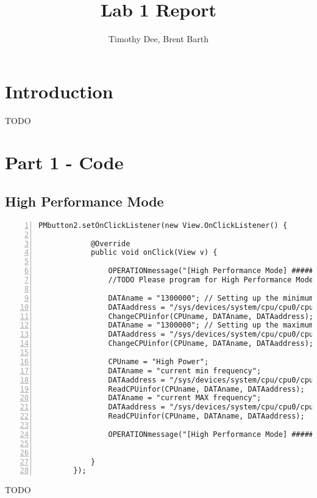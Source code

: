 \documentclass{article}	%
\author{Timothy Dee, Brent Barth}
\title{Lab 1 Report}
\begin{document}
\twocolumn
\thispagestyle{empty}		%
\maketitle			%



\section{Introduction}
TODO

\section{Part 1 - Code}
\subsection{High Performance Mode}
\begin{lstlisting}[float=*, caption={High Performance Mode},label={lst:HPM},numbers=left]
PMbutton2.setOnClickListener(new View.OnClickListener() {

			@Override
			public void onClick(View v) {

				OPERATIONmessage("[High Performance Mode] ###########################################");
				//TODO Please program for High Performance Mode here (done)

				DATAname = "1300000"; // Setting up the minimum frequency 1300 Mhz
				DATAaddress = "/sys/devices/system/cpu/cpu0/cpufreq/scaling_min_freq";
				ChangeCPUinfor(CPUname, DATAname, DATAaddress);
				DATAname = "1300000"; // Setting up the maximum frequency at 1300 MHz
				DATAaddress = "/sys/devices/system/cpu/cpu0/cpufreq/scaling_max_freq";
				ChangeCPUinfor(CPUname, DATAname, DATAaddress);

				CPUname = "High Power";
				DATAname = "current min frequency";
				DATAaddress = "/sys/devices/system/cpu/cpu0/cpufreq/scaling_min_freq";
				ReadCPUinfor(CPUname, DATAname, DATAaddress);
				DATAname = "current MAX frequency";
				DATAaddress = "/sys/devices/system/cpu/cpu0/cpufreq/scaling_max_freq";
				ReadCPUinfor(CPUname, DATAname, DATAaddress);

				OPERATIONmessage("[High Performance Mode] ###########################################");


			}
		});
\end{lstlisting}
TODO
\end{document}
